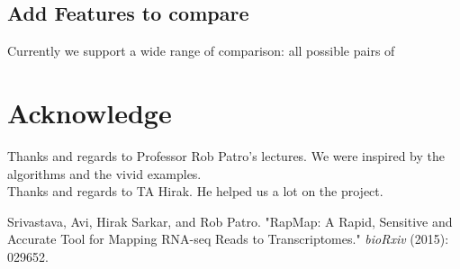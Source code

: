 \documentclass[11pt,letter]{article}
\begin{document}
\subsection {Add Features to compare}
Currently we support a wide range of comparison: all possible pairs of \\


\section{Acknowledge}
Thanks and regards to Professor Rob Patro's lectures. We were inspired by the algorithms and the vivid examples. \\
Thanks and regards to TA Hirak. He helped us a lot on the project.

% 


\begin{thebibliography}{100} %
 Srivastava, Avi, Hirak Sarkar, and Rob Patro. "RapMap: A Rapid, Sensitive and Accurate Tool for Mapping RNA-seq Reads to Transcriptomes." \emph{bioRxiv} (2015): 029652.
\end{thebibliography}

% 
\end{document}
